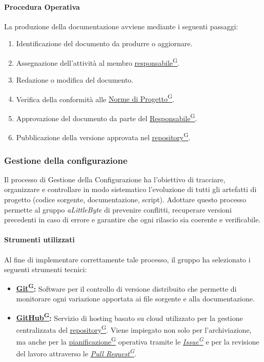 \documentclass[a4paper,12pt]{article}
\providecommand{\glslink}[2]{\href{https://alittlebyte-19.github.io/Documentazione/glossario.html\#gls-#1}{\underline{#2}\textsuperscript{\scriptsize G}}}
\begin{document}
\paragraph{Procedura Operativa}
La produzione della documentazione avviene mediante i seguenti passaggi:

\begin{enumerate}
    \item Identificazione del documento da produrre o aggiornare.
    \item Assegnazione dell'attività al membro \glslink{responsabile}{responsabile}.
    \item Redazione o modifica del documento.
    \item Verifica della conformità alle \glslink{norme-di-progetto}{Norme di Progetto}.
    \item Approvazione del documento da parte del \glslink{responsabile}{Responsabile}.
    \item Pubblicazione della versione approvata nel \glslink{repository}{repository}.
\end{enumerate}

\subsubsection{Gestione della configurazione}
Il processo di Gestione della Configurazione ha l'obiettivo di tracciare, organizzare e controllare in modo sistematico l'evoluzione di tutti gli artefatti di progetto (codice sorgente, documentazione, script). Adottare questo processo permette al gruppo \textit{aLittleByte} di prevenire conflitti, recuperare versioni precedenti in caso di errore e garantire che ogni rilascio sia coerente e verificabile.

\paragraph{Strumenti utilizzati}
Al fine di implementare correttamente tale processo, il gruppo ha selezionato i seguenti strumenti tecnici:
\begin{itemize}
    \item \textbf{\glslink{git}{Git}:} Software per il controllo di versione distribuito che permette di monitorare ogni variazione apportata ai file sorgente e alla documentazione.
    \item \textbf{\glslink{github}{GitHub}:} Servizio di hosting basato su cloud utilizzato per la gestione centralizzata del \glslink{repository}{repository}. Viene impiegato non solo per l'archiviazione, ma anche per la \glslink{pianificazione}{pianificazione} operativa tramite le \textit{\glslink{issue}{Issue}} e per la revisione del lavoro attraverso le \textit{\glslink{pull-request}{Pull Request}}.
\end{itemize}
\end{document}
